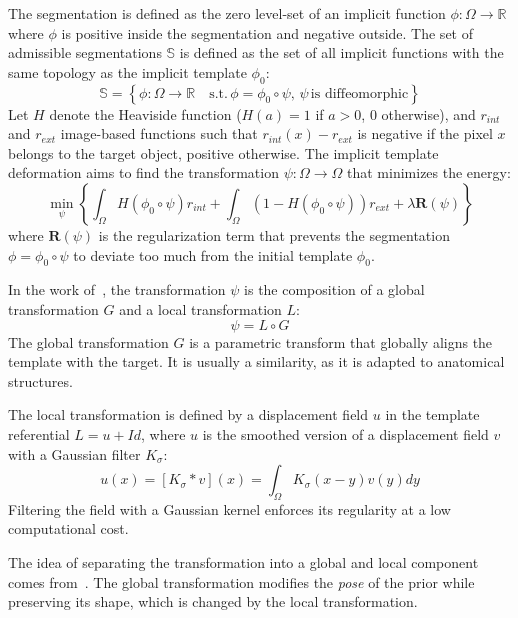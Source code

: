 The segmentation is defined as the zero level-set of an implicit function $\phi : \Omega \rightarrow \mathbb{R}$ where $\phi$ is positive inside the segmentation and negative outside. The set of admissible segmentations $\mathbb{S}$ is defined as the set of all implicit functions with the same topology as the implicit template $\phi_0$:
\begin{equation}
    \mathbb{S} = \left\{ \phi : \Omega \rightarrow \mathbb{R}\quad \text{s.t.}\, \phi = \phi_0 \circ \psi, \, \psi \, \text{is diffeomorphic} \right\}
\end{equation}
Let $H$ denote the Heaviside function ($H(a) = 1$ if $a > 0$, $0$ otherwise), and $r_{int}$ and $r_{ext}$ image-based functions such that $r_{int}(x) - r_{ext}$ is negative if the pixel $x$ belongs to the target object, positive otherwise. The implicit template deformation aims to find the transformation $\psi : \Omega \rightarrow \Omega$ that minimizes the energy:
\begin{equation}
    \min_{\psi} \left\{ \int_{\Omega} H \left( \phi_0 \circ \psi \right) r_{int} + \int_{\Omega} \left( 1 - H \left( \phi_0 \circ \psi \right) \right) r_{ext} + \lambda \mathbf{R} \left( \psi \right) \right\}
    \label{eq:implicit}
\end{equation}
where $\mathbf{R} \left( \psi \right)$ is the regularization term that prevents the segmentation $\phi = \phi_0 \circ \psi$ to deviate too much from the initial template $\phi_0$.

In the work of~\textcite{mory2012MICCAI}, the transformation $\psi$ is the composition of a global transformation $G$ and a local transformation $L$:
\begin{equation}
    \psi = L \circ G
\end{equation}
The global transformation $G$ is a parametric transform that globally aligns the template with the target. It is usually a similarity, as it is adapted to anatomical structures.

The local transformation is defined by a displacement field $u$ in the template referential $L = u + Id$, where $u$ is the  smoothed version of a displacement field $v$ with a Gaussian filter $K_{\sigma}$:
\begin{equation}
    u(x) = [K_{\sigma} * v](x) = \int_{\Omega} K_{\sigma}(x-y)v(y)dy
\end{equation}
Filtering the field with a Gaussian kernel enforces its regularity at a low computational cost.

The idea of separating the transformation into a global and local component comes from~\textcite{yezzi2003}. The global transformation modifies the \textit{pose} of the prior while preserving its shape, which is changed by the local transformation.

